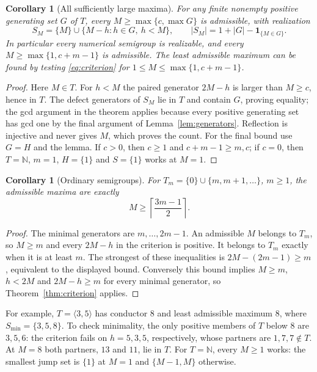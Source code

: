 \documentclass[11pt]{article}
\newtheorem{corollary}[theorem]{Corollary}
\newcommand{\N}{\mathbb N}
\newcommand{\gen}[1]{\langle #1\rangle}
\begin{document}
\begin{corollary}[All sufficiently large maxima]\label{cor:large}
For any finite nonempty positive generating set $G$ of $T$, every
$M\ge\max\{c,\max G\}$ is admissible, with realization
\[
 S_M=\{M\}\cup\{M-h:h\in G,\ h<M\},\qquad
 |S_M|=1+|G|-\mathbf1_{\{M\in G\}}.
\]
In particular every numerical semigroup is realizable, and every
$M\ge\max\{1,c+m-1\}$ is admissible. The least admissible maximum
can be found by testing \eqref{eq:criterion} for
$1\le M\le\max\{1,c+m-1\}$.
\end{corollary}
\begin{proof}
Here $M\in T$. For $h<M$ the paired generator $2M-h$ is larger than
$M\ge c$, hence in $T$. The defect generators of $S_M$ lie in $T$ and
contain $G$, proving equality; the gcd argument in the theorem applies
because every positive generating set has gcd one by the final argument
of Lemma~\ref{lem:generators}. Reflection is injective and never gives $M$,
which proves the count. For the final bound use $G=H$ and the lemma.
If $c>0$, then $c\ge1$ and $c+m-1\ge m,c$; if $c=0$, then
$T=\N$, $m=1$, $H=\{1\}$ and $S=\{1\}$ works at $M=1$.
\end{proof}

\begin{corollary}[Ordinary semigroups]\label{cor:ordinary}
For $T_m=\{0\}\cup\{m,m+1,\ldots\}$, $m\ge1$, the admissible maxima
are exactly
\[
 M\ge \left\lceil\frac{3m-1}{2}\right\rceil.
\]
\end{corollary}
\begin{proof}
The minimal generators are $m,\ldots,2m-1$. An admissible $M$ belongs
to $T_m$, so $M\ge m$ and every $2M-h$ in the criterion is positive.
It belongs to $T_m$ exactly when it is at least $m$.
The strongest of these inequalities is
$2M-(2m-1)\ge m$, equivalent to the displayed bound.
Conversely this bound implies $M\ge m$, $h<2M$ and $2M-h\ge m$
for every minimal generator, so Theorem~\ref{thm:criterion} applies.
\end{proof}

For example, $T=\gen{3,5}$ has conductor $8$ and least admissible
maximum $8$, where $S_{\min}=\{3,5,8\}$. To check minimality, the only
positive members of $T$ below $8$ are $3,5,6$: the criterion fails on
$h=5,3,5$, respectively, whose partners are $1,7,7\notin T$.
At $M=8$ both partners, $13$ and $11$, lie in $T$.
For $T=\N$, every $M\ge1$ works: the smallest jump set is $\{1\}$
at $M=1$ and $\{M-1,M\}$ otherwise.
\end{document}
